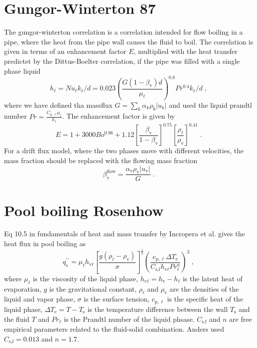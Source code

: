 \documentclass{article}
\begin{document}
\section{Gungor-Winterton 87}
The gungor-winterton correlation is a correlation intended for flow boiling in a pipe, where the heat from the pipe wall causes the fluid to boil. The correlation is given in terms of an enhancement factor $E$, multiplied with the heat transfer predictet by the Dittus-Boelter correlation, if the pipe was filled with a single phase liquid
\begin{equation}
    h_{\ell} = Nu_{\ell} k_{\ell} / d = 0.023 \left(\frac{G  \left(1 - \beta_{\text{v}}\right) d}{\mu_{\ell}} \right)^{0.8} Pr^{0.4} k_{\ell} / d\;,
\end{equation}
where we have defined tha massflux $G = \sum_{k} \alpha_{k} \rho_{\text{k}} \left| u_{k}\right|$ and used the liquid prandtl number $Pr = \frac{C_{\text{p},\ell} \mu_{\ell}}{k_{\ell}}$. The enhancement factor is given by
\begin{equation}
    E = 1 + 3000Bo^{0.86} + 1.12 \left[\frac{\beta_{\text{v}}}{1-\beta_{\text{v}}}\right]^{0.75} \left[ \frac{\rho_{\ell}}{\rho_{\text{v}}} \right]^{0.41}\;.
\end{equation}
For a drift flux model, where the two phases move with different velocities, the mass fraction should be replaced with the flowing mass fraction
\begin{equation}
    \beta_{\text{v}}^{\text{flow}} = \frac{\alpha_{\text{v}} \rho_{\text{v}} \left| u_{\text{v}} \right|}{G}\;.
\end{equation}

\section{Pool boiling Rosenhow}
Eq 10.5 in fundamentals of heat and mass transfer by Incropera et al. gives the heat flux in pool boiling as
\begin{equation}
    q_{\text{s}}^{\prime\prime} = \mu_{\ell} h_{\text{v}\ell} \left[\frac{g\left( \rho_{\ell} - \rho_{\text{v}} \right)}{\sigma}\right]^{\frac{1}{2}} \left( \frac{c_{\text{p},\ell}\Delta T_{\text{e}}}{{C_{\text{s,f}}h_{\text{v}\ell}} Pr_{\ell}^n} \right)^{3}\;,
\end{equation}
where $\mu_{\ell}$ is the viscosity of the liquid phase, $h_{\text{v}\ell} = h_{\text{v}} - h_{\ell}$ is the latent heat of evaporation, $g$ is the gravitational constant, $\rho_{\ell}$ and $\rho_{\text{v}}$ are the densities of the liquid and vapor phase, $\sigma$ is the surface tension, $c_{\text{p},\ell}$ is the specific heat of the liquid phase, $\Delta T_{\text{e}} = T - T_{\text{s}}$ is the temperature difference between the wall $T_{\text{s}}$ and the fluid $T$ and $Pr_{\ell}$ is the Prandtl number of the liquid phsase. $C_{\text{s,f}}$ and $n$ are free empirical parameters related to the fluid-solid combination. Anders used $C_{\text{s,f}} = 0.013$ and $n=1.7$. 
\end{document}
